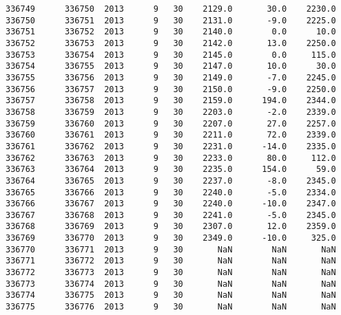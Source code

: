 \documentclass[11pt]{article}
\begin{document}
\begin{Verbatim}[commandchars=\\\{\}]
336749      336750  2013      9   30    2129.0       30.0    2230.0   
336750      336751  2013      9   30    2131.0       -9.0    2225.0   
336751      336752  2013      9   30    2140.0        0.0      10.0   
336752      336753  2013      9   30    2142.0       13.0    2250.0   
336753      336754  2013      9   30    2145.0        0.0     115.0   
336754      336755  2013      9   30    2147.0       10.0      30.0   
336755      336756  2013      9   30    2149.0       -7.0    2245.0   
336756      336757  2013      9   30    2150.0       -9.0    2250.0   
336757      336758  2013      9   30    2159.0      194.0    2344.0   
336758      336759  2013      9   30    2203.0       -2.0    2339.0   
336759      336760  2013      9   30    2207.0       27.0    2257.0   
336760      336761  2013      9   30    2211.0       72.0    2339.0   
336761      336762  2013      9   30    2231.0      -14.0    2335.0   
336762      336763  2013      9   30    2233.0       80.0     112.0   
336763      336764  2013      9   30    2235.0      154.0      59.0   
336764      336765  2013      9   30    2237.0       -8.0    2345.0   
336765      336766  2013      9   30    2240.0       -5.0    2334.0   
336766      336767  2013      9   30    2240.0      -10.0    2347.0   
336767      336768  2013      9   30    2241.0       -5.0    2345.0   
336768      336769  2013      9   30    2307.0       12.0    2359.0   
336769      336770  2013      9   30    2349.0      -10.0     325.0   
336770      336771  2013      9   30       NaN        NaN       NaN   
336771      336772  2013      9   30       NaN        NaN       NaN   
336772      336773  2013      9   30       NaN        NaN       NaN   
336773      336774  2013      9   30       NaN        NaN       NaN   
336774      336775  2013      9   30       NaN        NaN       NaN   
336775      336776  2013      9   30       NaN        NaN       NaN   


\end{Verbatim}
\end{document}
